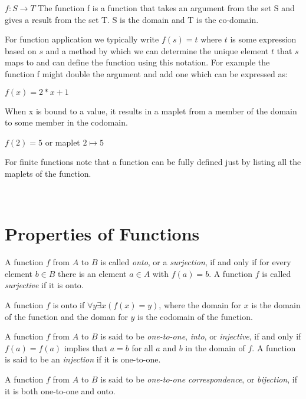 $f:S \rightarrow T$
The function f is a function that takes an argument from the set S and gives a result from the set T. S is the domain and T is the co-domain.

For function application we typically write $f(s)=t$ where $t$ is some expression based on $s$ and a method by which we can determine the unique element $t$ that $s$ maps to and can define the function using this notation. For example the function f might double the argument and add one which can be expressed as:

$f(x) = 2*x + 1$

When x is bound to a value, it results in a maplet from a member of the domain to some member in the codomain.

$f(2)=5$
or maplet $2 \mapsto 5$

For finite functions note that a function can be fully defined just by listing all the maplets of the function.

 

\


\section {Properties of Functions}
    \begin{definition} 
    A function $f$ from $A$ to $B$ is called \textit{onto}, or a \textit{surjection}, if and only if for every element $b \in B$ there is an element $a \in A$ with $f(a)=b$. A function $f$ is called \textit{surjective} if it is onto.
    \end{definition}

    \begin{notes}
    A function $f$ is onto if $\forall y \exists x(f(x)=y)$, where the domain for $x$ is the domain of the function and the doman for $y$ is the codomain of the function.
    \end{notes}

\begin{definition}   
A function $f$ from $A$ to $B$ is said to be \textit{one-to-one}, \textit{into}, or \textit{injective}, if and only if $f(a)=f(a)$ implies that $a=b$ for all $a$ and $b$ in the domain of $f$. A function is said to be an \textit{injection} if it is one-to-one.
\end{definition}

\begin{definition} 
A function $f$ from $A$ to $B$ is said to be \textit{one-to-one correspondence}, or \textit{bijection}, if it is both one-to-one and onto. 
\end{definition}

